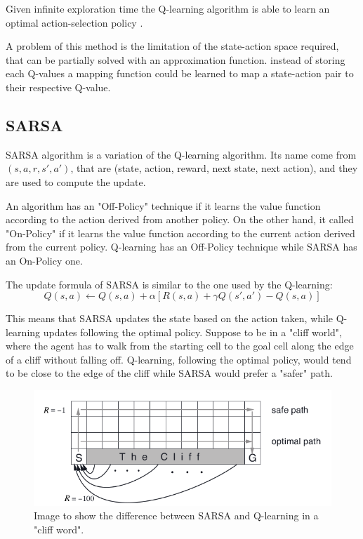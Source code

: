 Given infinite exploration time the Q-learning algorithm is able to learn an optimal action-selection policy \cite{melo2001convergence}.

A problem of this method is the limitation of the state-action space required, that can be partially solved with an approximation function.
instead of storing each Q-values a mapping function could be learned to map a state-action pair to their respective Q-value.

\subsection{SARSA}
SARSA algorithm \cite{qiang2011reinforcement} is a variation of the Q-learning algorithm.
Its name come from $(s, a, r, s', a')$, that are (state, action, reward, next state, next action), and they are used to compute the update.

An algorithm has an "Off-Policy" technique if it learns the value function according to the action derived from another policy. On the other hand, it called "On-Policy" if it learns the value function according to the current action derived from the current policy.
Q-learning has an Off-Policy technique while SARSA has an On-Policy one.

The update formula of SARSA is similar to the one used by the Q-learning:
\begin{equation}
    Q(s, a) \leftarrow Q(s, a) + \alpha [R(s, a) + \gamma Q(s', a') - Q(s, a)]
\end{equation}

This means that SARSA updates the state based on the action taken, while Q-learning updates following the optimal policy.
Suppose to be in a "cliff world", where the agent has to walk from the starting cell to the goal cell along the edge of a cliff without falling off. Q-learning, following the optimal policy, would tend to be close to the edge of the cliff while SARSA would prefer a "safer" path.

\begin{figure}[ht]
    \centering
    \includegraphics[scale=0.4]{images/cliff_word.png}
    \caption{Image to show the difference between SARSA and Q-learning in a "cliff word".}
\end{figure}

